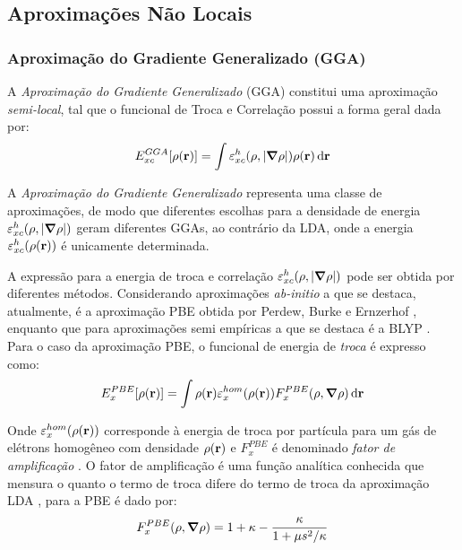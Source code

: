 \subsection{Aproximações Não Locais}

\subsubsection{Aproximação do Gradiente Generalizado (GGA)\label{sec:gga}}
A \textit{ Aproximação do Gradiente Generalizado} (GGA) constitui uma aproximação \textit{semi-local}, tal que o funcional de Troca e Correlação possui a forma geral dada por:
\begin{equation}
	E_{xc}^{GGA}\bqty{\dens}= \int\varepsilon_{xc}^{h}\pqty{\rho,\abs{\grad{\rho}}}\dens\dr
\end{equation}


A \textit{Aproximação do Gradiente Generalizado} representa uma classe de aproximações, de modo que diferentes escolhas para a densidade de energia $ \varepsilon_{xc}^{h}\pqty{\rho,\abs{\grad{\rho}}}$ geram diferentes GGAs, ao contrário da LDA, onde a energia $ \varepsilon_{xc}^{h}\pqty{\dens} $ é unicamente determinada. 

A expressão para a energia de troca e correlação  $ \varepsilon_{xc}^{h}\pqty{\rho,\abs{\grad{\rho}}} $ pode ser obtida por diferentes métodos. Considerando aproximações \textit{ab-initio} a que se destaca, atualmente, é a aproximação PBE obtida por Perdew, Burke e Ernzerhof \cite{PBE}, enquanto que para aproximações semi empíricas a que se destaca é a BLYP \cite{blyp_b}\cite{blyp_b-2}. 
Para o caso da aproximação PBE, o funcional de energia de \textit{troca} é expresso como:
\begin{equation}
	E^{PBE}_{x}\bqty{\dens}=\int \dens \varepsilon_{x}^{hom}(\dens)F^{PBE}_x(\rho,\grad{\rho})\dr
\end{equation}

Onde $ \varepsilon_{x}^{hom}(\rho(\vb{r})) $ corresponde à energia de troca por partícula para um gás de elétrons homogêneo com densidade $ \rho(\vb{r}) $ e $ F^{PBE}_x $ é denominado \textit{fator de amplificação} \cite{rev_dft}. O fator de amplificação é uma função analítica conhecida que mensura o quanto o termo de troca difere do termo de troca da aproximação LDA \cite{abc_dft}, para a PBE é dado por: 
\begin{equation}\label{eq:troca_pbe}
	F_{x}^{PBE}(\rho,\grad{\rho})=1+\kappa-\frac{\kappa}{1+\mu s^2/\kappa}
\end{equation}

